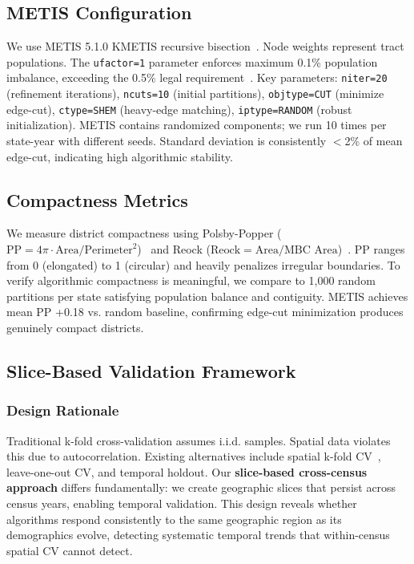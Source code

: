 \subsection{METIS Configuration}

We use METIS 5.1.0 KMETIS recursive bisection~\cite{karypis1998}. Node weights represent tract populations. The \texttt{ufactor=1} parameter enforces maximum 0.1\% population imbalance, exceeding the 0.5\% legal requirement~\cite{karcher1983}. Key parameters: \texttt{niter=20} (refinement iterations), \texttt{ncuts=10} (initial partitions), \texttt{objtype=CUT} (minimize edge-cut), \texttt{ctype=SHEM} (heavy-edge matching), \texttt{iptype=RANDOM} (robust initialization). METIS contains randomized components; we run 10 times per state-year with different seeds. Standard deviation is consistently $<$2\% of mean edge-cut, indicating high algorithmic stability.

\subsection{Compactness Metrics}

We measure district compactness using Polsby-Popper ($\text{PP} = 4\pi \cdot \text{Area}/\text{Perimeter}^2$)~\cite{polsby1991} and Reock ($\text{Reock} = \text{Area}/\text{MBC Area}$)~\cite{reock1961}. PP ranges from 0 (elongated) to 1 (circular) and heavily penalizes irregular boundaries. To verify algorithmic compactness is meaningful, we compare to 1,000 random partitions per state satisfying population balance and contiguity. METIS achieves mean PP +0.18 vs. random baseline, confirming edge-cut minimization produces genuinely compact districts.

\subsection{Slice-Based Validation Framework}

\subsubsection{Design Rationale}

Traditional k-fold cross-validation assumes i.i.d. samples. Spatial data violates this due to autocorrelation. Existing alternatives include spatial k-fold CV~\cite{roberts2017}, leave-one-out CV, and temporal holdout. Our \textbf{slice-based cross-census approach} differs fundamentally: we create geographic slices that persist across census years, enabling temporal validation. This design reveals whether algorithms respond consistently to the same geographic region as its demographics evolve, detecting systematic temporal trends that within-census spatial CV cannot detect.

